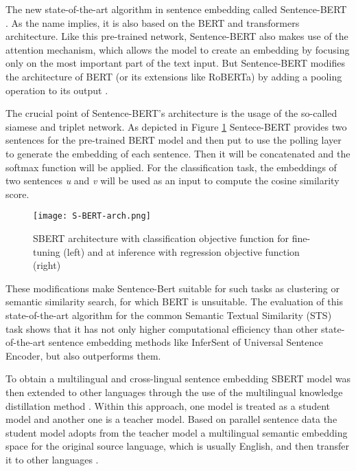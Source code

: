 \documentclass[fontsize=12pt,a4paper,twoside,openany]{scrbook}
\begin{document}
The new state-of-the-art algorithm in sentence embedding called Sentence-BERT \parencite{Reimers19}. As the name implies, it is also based on the BERT and transformers architecture. Like this pre-trained network, Sentence-BERT also makes use of the attention mechanism, which allows the model to create an embedding by focusing only on the most important part of the text input. But Sentence-BERT modifies the architecture of BERT (or its extensions like RoBERTa) by adding a pooling operation to its output \parencite{Reimers19}.

The crucial point of Sentence-BERT's architecture is the usage of the so-called siamese and triplet network. As depicted in Figure \ref{fig:S-BERT-arch} Sentece-BERT provides two sentences for the pre-trained BERT model and then put to use the polling layer to generate the embedding of each sentence. Then it will be concatenated and the softmax function will be applied. For the classification task, the embeddings of two sentences \emph{u} and \emph{v} will be used as an input to compute the cosine similarity score.


\begin{figure}[h]
\centering
\texttt{[image: S-BERT-arch.png]}
\caption{SBERT architecture with classification objective function for fine-tuning (left) and at inference with regression objective function (right) \parencite[from][]{Reimers19}}
\label{fig:S-BERT-arch}
\end{figure}

These modifications make Sentence-Bert suitable for such tasks as clustering or semantic similarity search, for which BERT is unsuitable. The evaluation of this state-of-the-art algorithm for the common Semantic Textual Similarity (STS) task shows that it has not only higher computational efficiency than other state-of-the-art sentence embedding methods like InferSent of Universal Sentence Encoder, but also outperforms them.

To obtain a multilingual and cross-lingual sentence embedding SBERT model was then extended to other languages through the use of the multilingual knowledge distillation method \parencite{Reimers20}. Within this approach, one model is treated as a student model and another one is a teacher model. Based on parallel sentence data the student model adopts from the teacher model a multilingual semantic embedding space for the original source language, which is usually English, and then transfer it to other languages \parencite{Reimers20}. 
\end{document}
